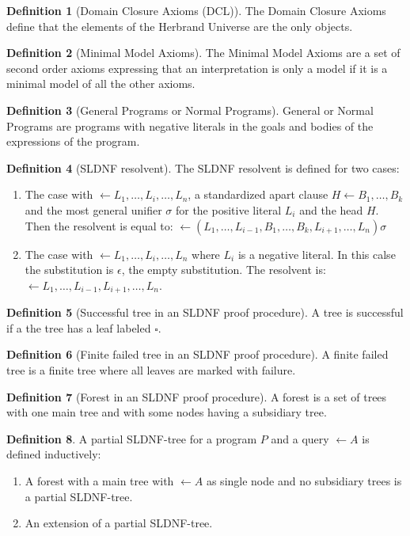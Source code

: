\documentclass{article}
\newcommand{\brak}[1]{\ensuremath{\left(#1\right)}}
\theoremstyle{definition}
\newtheorem{definition}{Definition}
\theoremstyle{plain}
\begin{document}
\begin{definition}[Domain Closure Axioms (DCL)]
The Domain Closure Axioms define that the elements of the Herbrand Universe are the only objects.
\end{definition}
\begin{definition}[Minimal Model Axioms]
The Minimal Model Axioms are a set of second order axioms expressing that an interpretation is only a model if it is a minimal model of all the other axioms.
\end{definition}
\begin{definition}[General Programs or Normal Programs]
General or Normal Programs are programs with negative literals in the goals and bodies of the expressions of the program.
\end{definition}
\begin{definition}[SLDNF resolvent]
The SLDNF resolvent is defined for two cases:
\begin{enumerate}
 \item The case with $\leftarrow L_1,\ldots,L_i,\ldots,L_n$, a standardized apart clause $H\leftarrow B_1,\ldots,B_k$ and the most general unifier $\sigma$ for the positive literal $L_i$ and the head $H$. Then the resolvent is equal to: $\leftarrow\brak{L_1,\ldots,L_{i-1},B_1,\ldots,B_k,L_{i+1},\ldots,L_n}\sigma$
 \item The case with $\leftarrow L_1,\ldots,L_i,\ldots,L_n$ where $L_i$ is a negative literal. In this calse the substitution is $\epsilon$, the empty substitution. The resolvent is: $\leftarrow L_1,\ldots,L_{i-1},L_{i+1},\ldots,L_n$.
\end{enumerate}
\end{definition}
\begin{definition}[Successful tree in an SLDNF proof procedure]
A tree is successful if a the tree has a leaf labeled $\square$.
\end{definition}
\begin{definition}[Finite failed tree in an SLDNF proof procedure]
A finite failed tree is a finite tree where all leaves are marked with failure.
\end{definition}
\begin{definition}[Forest in an SLDNF proof procedure]
A forest is a set of trees with one main tree and with some nodes having a subsidiary tree.
\end{definition}
\begin{definition}
A partial SLDNF-tree for a program $P$ and a query $\leftarrow A$ is defined inductively:
\begin{enumerate}
 \item A forest with a main tree with $\leftarrow A$ as single node and no subsidiary trees is a partial SLDNF-tree.
 \item An extension of a partial SLDNF-tree.
\end{enumerate}
\end{definition}
\end{document}
